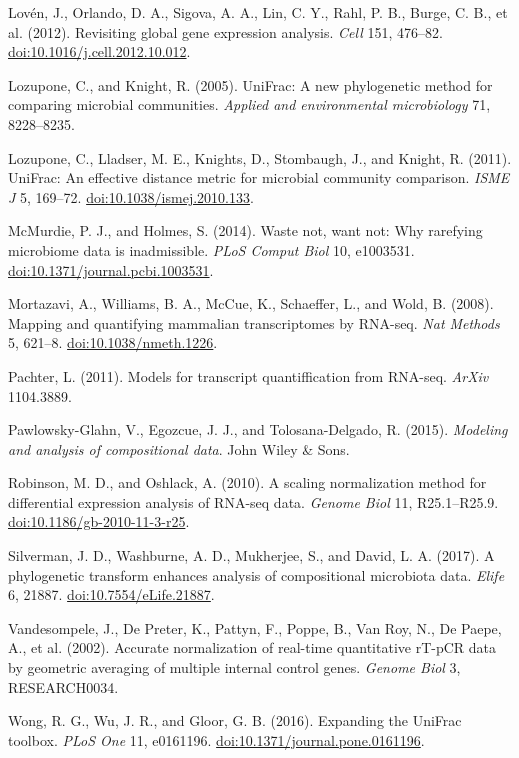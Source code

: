 \documentclass[twocolumn]{article}
\begin{document}
Lovén, J., Orlando, D. A., Sigova, A. A., Lin, C. Y., Rahl, P. B.,
Burge, C. B., et al. (2012). Revisiting global gene expression analysis.
\emph{Cell} 151, 476--82.
\href{http://doi.org/10.1016/j.cell.2012.10.012}{doi:10.1016/j.cell.2012.10.012}.

Lozupone, C., and Knight, R. (2005). UniFrac: A new phylogenetic method
for comparing microbial communities. \emph{Applied and environmental
microbiology} 71, 8228--8235.

Lozupone, C., Lladser, M. E., Knights, D., Stombaugh, J., and Knight, R.
(2011). UniFrac: An effective distance metric for microbial community
comparison. \emph{ISME J} 5, 169--72.
\href{http://doi.org/10.1038/ismej.2010.133}{doi:10.1038/ismej.2010.133}.

McMurdie, P. J., and Holmes, S. (2014). Waste not, want not: Why
rarefying microbiome data is inadmissible. \emph{PLoS Comput Biol} 10,
e1003531.
\href{http://doi.org/10.1371/journal.pcbi.1003531}{doi:10.1371/journal.pcbi.1003531}.

Mortazavi, A., Williams, B. A., McCue, K., Schaeffer, L., and Wold, B.
(2008). Mapping and quantifying mammalian transcriptomes by RNA-seq.
\emph{Nat Methods} 5, 621--8.
\href{http://doi.org/10.1038/nmeth.1226}{doi:10.1038/nmeth.1226}.

Pachter, L. (2011). Models for transcript quantiffication from RNA-seq.
\emph{ArXiv} 1104.3889.

Pawlowsky-Glahn, V., Egozcue, J. J., and Tolosana-Delgado, R. (2015).
\emph{Modeling and analysis of compositional data}. John Wiley \& Sons.

Robinson, M. D., and Oshlack, A. (2010). A scaling normalization method
for differential expression analysis of RNA-seq data. \emph{Genome Biol}
11, R25.1--R25.9.
\href{http://doi.org/10.1186/gb-2010-11-3-r25}{doi:10.1186/gb-2010-11-3-r25}.

Silverman, J. D., Washburne, A. D., Mukherjee, S., and David, L. A.
(2017). A phylogenetic transform enhances analysis of compositional
microbiota data. \emph{Elife} 6, 21887.
\href{http://doi.org/10.7554/eLife.21887}{doi:10.7554/eLife.21887}.

Vandesompele, J., De Preter, K., Pattyn, F., Poppe, B., Van Roy, N., De
Paepe, A., et al. (2002). Accurate normalization of real-time
quantitative rT-pCR data by geometric averaging of multiple internal
control genes. \emph{Genome Biol} 3, RESEARCH0034.

Wong, R. G., Wu, J. R., and Gloor, G. B. (2016). Expanding the UniFrac
toolbox. \emph{PLoS One} 11, e0161196.
\href{http://doi.org/10.1371/journal.pone.0161196}{doi:10.1371/journal.pone.0161196}.
\end{document}
